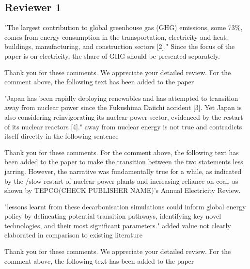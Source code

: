 \documentclass[answers,11pt]{exam}
\begin{document}
\begin{questions}
        \section*{Reviewer 1}

        
         \question "The largest contribution to global greenhouse gas (GHG) emissions, some 73\%, comes from energy consumption in the transportation, electricity and heat, buildings, manufacturing, and construction sectors [2]."
Since the focus of the paper is on electricity, the share of GHG should be presented separately.
        
        \begin{solution}
                Thank you for these comments. We appreciate your detailed review. For the comment above, the following text has been added to the paper
        \end{solution}

        
         \question "Japan has been rapidly deploying renewables and has attempted to transition away from nuclear power since the Fukushima Daiichi accident [3]. Yet Japan is also considering reinvigorating its nuclear power sector, evidenced by the restart of its nuclear reactors [4]."
 away from nuclear energy is not true and contradicts itself directly in the following sentence
        
        \begin{solution}
                Thank you for these comments. For the comment above, the following text has been added to the paper to make the transition between the two statements less jarring. However, the narrative was fundamentally true for a while, as indicated by the /slow-restart of nuclear power plants and increasing reliance on coal, as shown by TEPCO(CHECK PUBLISHER NAME)'s Annual Electricity Review.
                
        \end{solution}
        

         \question "lessons learnt from these decarbonisation simulations could inform global energy policy by delineating potential transition pathways, identifying key novel technologies, and their most significant parameters."
	added value not clearly elaborated in comparison to existing literature        
        \begin{solution}
                Thank you for these comments. We appreciate your detailed review. For the comment above, the following text has been added to the paper
        \end{solution}	
        

\end{questions}
\end{document}
